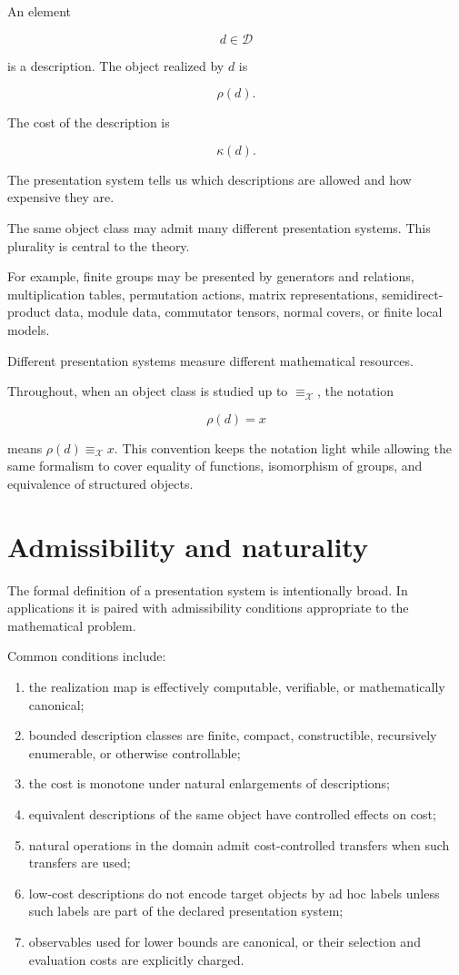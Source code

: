 \documentclass[11pt]{article}
\begin{document}
An element

\[
d\in\mathcal D
\]

is a description. The object realized by \(d\) is

\[
\rho(d).
\]

The cost of the description is

\[
\kappa(d).
\]

The presentation system tells us which descriptions are allowed and how expensive they are.

The same object class may admit many different presentation systems. This plurality is central to the theory.

For example, finite groups may be presented by generators and relations, multiplication tables, permutation actions, matrix representations, semidirect-product data, module data, commutator tensors, normal covers, or finite local models.

Different presentation systems measure different mathematical resources.

Throughout, when an object class is studied up to \(\equiv_\mathcal X\), the notation

\[
\rho(d)=x
\]

means \(\rho(d)\equiv_\mathcal X x\). This convention keeps the notation light while allowing the same formalism to cover equality of functions, isomorphism of groups, and equivalence of structured objects.


\section{Admissibility and naturality}

The formal definition of a presentation system is intentionally broad. In applications it is paired with admissibility conditions appropriate to the mathematical problem.

Common conditions include:
\begin{enumerate}[label=(\roman*)]
\item the realization map is effectively computable, verifiable, or mathematically canonical;
\item bounded description classes are finite, compact, constructible, recursively enumerable, or otherwise controllable;
\item the cost is monotone under natural enlargements of descriptions;
\item equivalent descriptions of the same object have controlled effects on cost;
\item natural operations in the domain admit cost-controlled transfers when such transfers are used;
\item low-cost descriptions do not encode target objects by ad hoc labels unless such labels are part of the declared presentation system;
\item observables used for lower bounds are canonical, or their selection and evaluation costs are explicitly charged.
\end{enumerate}
\end{document}
